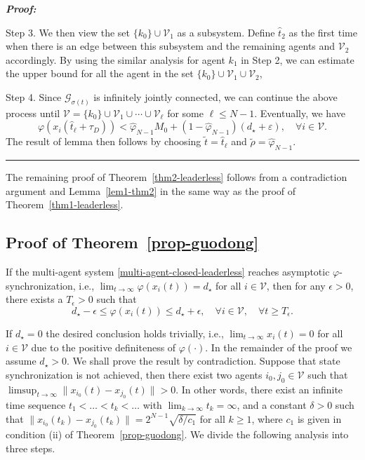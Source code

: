 \documentclass[a4paper, 11pt]{article}
\newenvironment{IEEEproof}[1][\bf Proof]{\smallskip\par\noindent\textit{#1: }}{\hspace*{\fill} \rule{6pt}{6pt}\smallskip}
\newcommand{\eps}{\varepsilon}
\begin{document}
\begin{IEEEproof}
\vspace{2mm}

\noindent Step 3. We then view the set $\{k_0\} \cup \mathcal{V}_1$ as a subsystem. Define $\hat{t}_2$
as the first time when there is an edge between this subsystem and the remaining agents and $\mathcal{V}_2$ accordingly.
By using the similar analysis for agent $k_1$ in Step 2, we can estimate the upper bound for all the agent in the set
$\{k_0\} \cup \mathcal{V}_1 \cup \mathcal{V}_2$,

\vspace{2mm}

\noindent Step 4. Since $\mathcal{G}_{\sigma(t)}$ is infinitely jointly connected, we can continue the above process until
$\mathcal{V}=\{k_0\} \cup \mathcal{V}_1 \cup \cdots \cup \mathcal{V}_\ell$ for some $\ell \leq N-1$.
Eventually, we have
\begin{equation*}\label{inner-key-N-undirected-key}
\varphi(x_{i}(\hat{t}_\ell+\tau_D)) <  \hat{\varphi}_{N-1} M_0+(1-\hat{\varphi}_{N-1})(d_\star+\eps), \quad \forall i \in \mathcal{V}.
\end{equation*}
The result of lemma then follows by choosing $\tilde{t}=\hat{t}_{\ell}$ and $\tilde{\rho}=\hat{\varphi}_{N-1}$.
\end{IEEEproof}

The remaining proof of Theorem~\ref{thm2-leaderless} follows from a contradiction argument
and Lemma~\ref{lem1-thm2} in the same way as the proof of Theorem~\ref{thm1-leaderless}.


\subsection{Proof of Theorem~\ref{prop-guodong}}\label{proof-prop-guodong}
If the multi-agent system \eqref{multi-agent-closed-leaderless}
reaches  asymptotic $\varphi$-synchronization, i.e.,
$\lim_{t \rightarrow \infty} \varphi(x_i(t)) =d_\star$  for all $i \in \mathcal{V}$, then for any $\epsilon >0$, there exists a $T_\epsilon>0$ such that
\begin{equation}\label{bound-phi}
d_\star -\epsilon\leq \varphi(x_i(t)) \leq d_\star +\epsilon, \quad \forall i \in \mathcal{V}, \quad \forall t \geq T_\epsilon.
\end{equation}

If $d_\star=0$ the desired conclusion holds trivially, i.e., $\lim_{t \rightarrow \infty}x_i(t)=0$ for all $i \in \mathcal{V}$
due to the positive definiteness of $\varphi(\cdot)$.
In the remainder of the proof we assume $d_\star >0$. We shall prove the result by contradiction. Suppose that state synchronization is not achieved, then there exist two agents $i_0,j_0 \in\mathcal{V}$ such that $\limsup_{t\to \infty} \|x_{i_0}(t)-x_{j_0}(t)\|>0$.
In other words, there exist an infinite time sequence $t_1<\dots<t_k<\dots$ with $\lim_{k\to \infty} t_k =\infty$, and a constant $\delta>0$ such that $\|x_{i_0}(t_k)-x_{j_0}(t_k)\|=2^{N-1}\sqrt{\delta/c_1}$ for all $k\geq 1$, where $c_1$ is given in condition (ii) of Theorem~\ref{prop-guodong}. We divide the following analysis into three steps.
\end{document}
